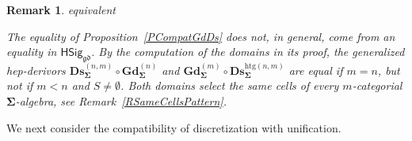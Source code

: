 \documentclass[a4paper, reqno]{amsbook}
\makeatletter
\newcommand{\sig}[1]{\mathbf{#1}}             %
\newcommand{\gd}{\mathfrak{gd}}              %
\newcommand{\htg}{\mathrm{htg}}                %
\newcommand{\bGd}{\mathbf{Gd}}
\newcommand{\bDs}{\mathbf{Ds}}
\theoremstyle{plain}
\newtheorem{remark}[theorem]{Remark}
\theoremstyle{definition}
\newcommand*{\CA@leanpending}{}
\newcommand*{\CA@leanrelation}{}
\newcommand*{\lean}[2]{%
  \ifcsname\string\color@lean@#1\endcsname\else
    \PackageError{main}{Unknown relation `#1' in \string\lean}{Use equivalent, weaker or stronger.}%
  \fi
  \gdef\CA@leanrelation{#1}%
  \gdef\CA@leanpending{#2}}
\makeatother
\begin{document}
\begin{remark}\label{RCompatGdDsDerivors}\lean{equivalent}{Dimensions.discretization_graduation_derivor,Dimensions.discretization_graduation_eq_iff,Dimensions.discretization_graduation_sameCells}
The equality of Proposition~\ref{PCompatGdDs} does not, in general, come from an equality in $\mathsf{HSig}_{\gd}$.
By the computation of the domains in its proof, the generalized hep-derivors $\bDs^{(n,m)}_{\sig{\Sigma}}\circ\bGd^{(n)}_{\sig{\Sigma}}$ and $\bGd^{(m)}_{\sig{\Sigma}}\circ\bDs^{\htg(n,m)}_{\sig{\Sigma}}$ are equal if $m=n$, but not if $m<n$ and $S\neq\emptyset$.
Both domains select the same cells of every $m$-categorial $\sig{\Sigma}$-algebra, see Remark~\ref{RSameCellsPattern}.
\end{remark}

We next consider the compatibility of discretization with unification.
\end{document}
